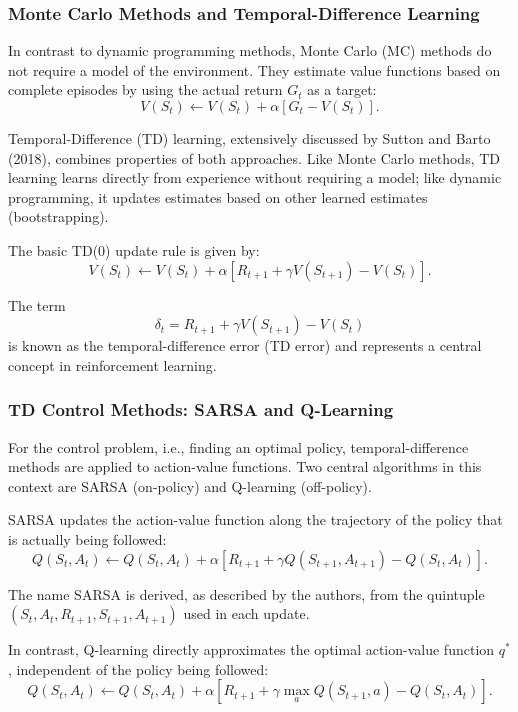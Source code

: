 \subsubsection{Monte Carlo Methods and Temporal-Difference Learning}

In contrast to dynamic programming methods, Monte Carlo (MC) methods do not require a model of the environment. They estimate value functions based on complete episodes by using the actual return \(G_t\) as a target:
\[
V(S_t) \leftarrow V(S_t) + \alpha \left[ G_t - V(S_t) \right].
\]

Temporal-Difference (TD) learning, extensively discussed by Sutton and Barto (2018), combines properties of both approaches. Like Monte Carlo methods, TD learning learns directly from experience without requiring a model; like dynamic programming, it updates estimates based on other learned estimates (bootstrapping).

The basic TD(0) update rule is given by:
\[
V(S_t) \leftarrow V(S_t) + \alpha \left[ R_{t+1} + \gamma V(S_{t+1}) - V(S_t) \right].
\]

The term
\[
\delta_t = R_{t+1} + \gamma V(S_{t+1}) - V(S_t)
\]
is known as the temporal-difference error (TD error) and represents a central concept in reinforcement learning.

\subsubsection{TD Control Methods: SARSA and Q-Learning}

For the control problem, i.e., finding an optimal policy, temporal-difference methods are applied to action-value functions. Two central algorithms in this context are SARSA (on-policy) and Q-learning (off-policy).

SARSA updates the action-value function along the trajectory of the policy that is actually being followed:
\[
Q(S_t, A_t) \leftarrow Q(S_t, A_t) + \alpha \left[ R_{t+1} + \gamma Q(S_{t+1}, A_{t+1}) - Q(S_t, A_t) \right].
\]

The name SARSA is derived, as described by the authors, from the quintuple \((S_t, A_t, R_{t+1}, S_{t+1}, A_{t+1})\) used in each update.

In contrast, Q-learning directly approximates the optimal action-value function \(q^*\), independent of the policy being followed:
\[
Q(S_t, A_t) \leftarrow Q(S_t, A_t) + \alpha \left[ R_{t+1} + \gamma \max_{a} Q(S_{t+1}, a) - Q(S_t, A_t) \right].
\]


